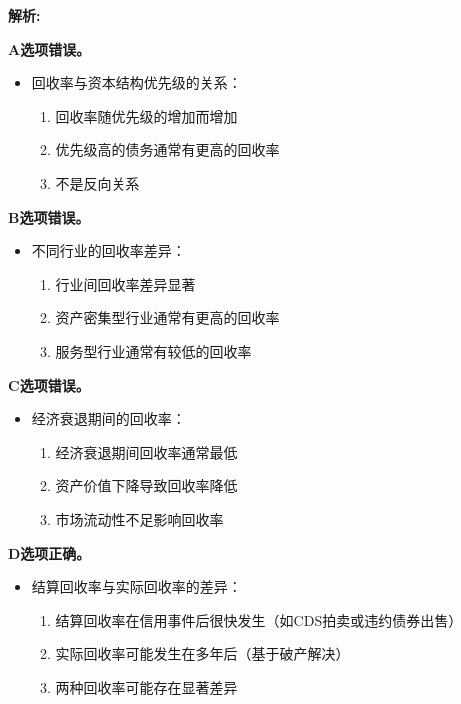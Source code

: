 \documentclass{article}
\newenvironment{explanation}
{\textbf{解析:}\par}
{\par}
\begin{document}
\begin{explanation}
    \textbf{A选项错误。}
    \begin{itemize}
        \item 回收率与资本结构优先级的关系：
        \begin{enumerate}
            \item 回收率随优先级的增加而增加
            \item 优先级高的债务通常有更高的回收率
            \item 不是反向关系
        \end{enumerate}
    \end{itemize}
    
    \textbf{B选项错误。}
    \begin{itemize}
        \item 不同行业的回收率差异：
        \begin{enumerate}
            \item 行业间回收率差异显著
            \item 资产密集型行业通常有更高的回收率
            \item 服务型行业通常有较低的回收率
        \end{enumerate}
    \end{itemize}
    
    \textbf{C选项错误。}
    \begin{itemize}
        \item 经济衰退期间的回收率：
        \begin{enumerate}
            \item 经济衰退期间回收率通常最低
            \item 资产价值下降导致回收率降低
            \item 市场流动性不足影响回收率
        \end{enumerate}
    \end{itemize}
    
    \textbf{D选项正确。}
    \begin{itemize}
        \item 结算回收率与实际回收率的差异：
        \begin{enumerate}
            \item 结算回收率在信用事件后很快发生（如CDS拍卖或违约债券出售）
            \item 实际回收率可能发生在多年后（基于破产解决）
            \item 两种回收率可能存在显著差异
        \end{enumerate}
    \end{itemize}
\end{explanation}
\end{document}
